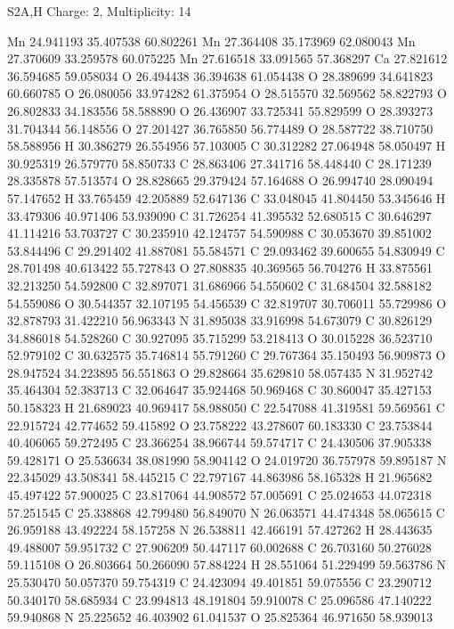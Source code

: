 \documentclass{article}
\begin{document}
S2A,H   Charge: 2, Multiplicity: 14    
   
Mn 24.941193 35.407538 60.802261
Mn 27.364408 35.173969 62.080043
Mn 27.370609 33.259578 60.075225
Mn 27.616518 33.091565 57.368297
Ca 27.821612 36.594685 59.058034
O 26.494438 36.394638 61.054438
O 28.389699 34.641823 60.660785
O 26.080056 33.974282 61.375954
O 28.515570 32.569562 58.822793
O 26.802833 34.183556 58.588890
O 26.436907 33.725341 55.829599
O 28.393273 31.704344 56.148556
O 27.201427 36.765850 56.774489
O 28.587722 38.710750 58.588956
H 30.386279 26.554956 57.103005
C 30.312282 27.064948 58.050497
H 30.925319 26.579770 58.850733
C 28.863406 27.341716 58.448440
C 28.171239 28.335878 57.513574
O 28.828665 29.379424 57.164688
O 26.994740 28.090494 57.147652
H 33.765459 42.205889 52.647136
C 33.048045 41.804450 53.345646
H 33.479306 40.971406 53.939090
C 31.726254 41.395532 52.680515
C 30.646297 41.114216 53.703727
C 30.235910 42.124757 54.590988
C 30.053670 39.851002 53.844496
C 29.291402 41.887081 55.584571
C 29.093462 39.600655 54.830949
C 28.701498 40.613422 55.727843
O 27.808835 40.369565 56.704276
H 33.875561 32.213250 54.592800
C 32.897071 31.686966 54.550602
C 31.684504 32.588182 54.559086
O 30.544357 32.107195 54.456539
C 32.819707 30.706011 55.729986
O 32.878793 31.422210 56.963343
N 31.895038 33.916998 54.673079
C 30.826129 34.886018 54.528260
C 30.927095 35.715299 53.218413
O 30.015228 36.523710 52.979102
C 30.632575 35.746814 55.791260
C 29.767364 35.150493 56.909873
O 28.947524 34.223895 56.551863
O 29.828664 35.629810 58.057435
N 31.952742 35.464304 52.383713
C 32.064647 35.924468 50.969468
C 30.860047 35.427153 50.158323
H 21.689023 40.969417 58.988050
C 22.547088 41.319581 59.569561
C 22.915724 42.774652 59.415892
O 23.758222 43.278607 60.183330
C 23.753844 40.406065 59.272495
C 23.366254 38.966744 59.574717
C 24.430506 37.905338 59.428171
O 25.536634 38.081990 58.904142
O 24.019720 36.757978 59.895187
N 22.345029 43.508341 58.445215
C 22.797167 44.863986 58.165328
H 21.965682 45.497422 57.900025
C 23.817064 44.908572 57.005691
C 25.024653 44.072318 57.251545
C 25.338868 42.799480 56.849070
N 26.063571 44.474348 58.065615
C 26.959188 43.492224 58.157258
N 26.538811 42.466191 57.427262
H 28.443635 49.488007 59.951732
C 27.906209 50.447117 60.002688
C 26.703160 50.276028 59.115108
O 26.803664 50.266090 57.884224
H 28.551064 51.229499 59.563786
N 25.530470 50.057370 59.754319
C 24.423094 49.401851 59.075556
C 23.290712 50.340170 58.685934
C 23.994813 48.191804 59.910078
C 25.096586 47.140222 59.940868
N 25.225652 46.403902 61.041537
O 25.825364 46.971650 58.939013
\end{document}
